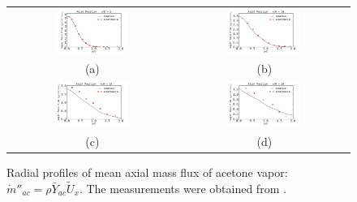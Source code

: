 \documentclass[preprint,12pt,review]{elsarticle}
\begin{document}
\begin{figure}[!htb]
 \centering
\begin{tabular}{cc}
 \includegraphics[width=0.45\textwidth]{../thesis/figuras/chap5/massflow/mvapor5.png} & \includegraphics[width=0.45\textwidth]{../thesis/figuras/chap5/massflow/mvapor10.png} \\
(a) & (b) \\
\includegraphics[width=0.45\textwidth]{../thesis/figuras/chap5/massflow/mvapor15.png} & \includegraphics[width=0.45\textwidth]{../thesis/figuras/chap5/massflow/mvapor20.png} \\
(c) & (d)
\end{tabular}
 \caption{Radial profiles of mean axial mass flux of acetone vapor: $\dot{m}''_{ac}=\rho \bar{Y}_{ac} \tilde{U}_x$. The measurements were obtained from \citet{chen}.}
 \label{fig: vapor_flux}
\end{figure}
\end{document}
